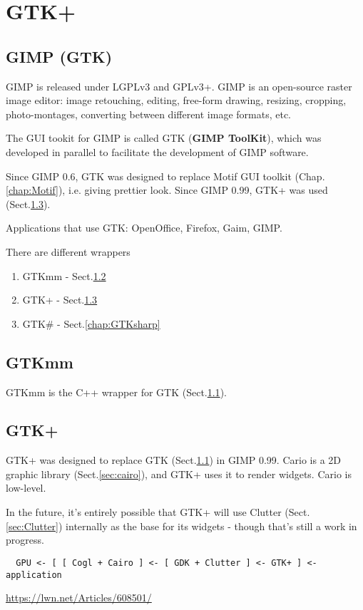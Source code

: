 \chapter{GTK+}
\label{chap:GTK+}

\section{GIMP (GTK)}
\label{sec:GTK}

GIMP is released under LGPLv3 and GPLv3+. GIMP is an open-source raster image
editor: image retouching, editing, free-form drawing, resizing, cropping,
photo-montages, converting between different image formats, etc.

The GUI tookit for GIMP is called GTK ({\bf GIMP ToolKit}), which was developed
in parallel to facilitate the development of GIMP software.

Since GIMP 0.6, GTK was designed to replace Motif GUI toolkit
(Chap.\ref{chap:Motif}), i.e. giving prettier look. Since GIMP 0.99, GTK+ was
used (Sect.\ref{sec:GTK+}).

Applications that use GTK: OpenOffice, Firefox, Gaim, GIMP.

There are different wrappers
\begin{enumerate}
  \item GTKmm - Sect.\ref{sec:GTKmm}
  \item GTK+ - Sect.\ref{sec:GTK+}
  \item GTK\# - Sect.\ref{chap:GTKsharp}
\end{enumerate}

\section{GTKmm}
\label{sec:GTKmm}

GTKmm is the C++ wrapper for GTK (Sect.\ref{sec:GTK}).

\section{GTK+}
\label{sec:GTK+}

GTK+ was designed to replace GTK (Sect.\ref{sec:GTK}) in GIMP 0.99.
Cario is a 2D graphic library (Sect.\ref{sec:cairo}), and GTK+ uses it to render
widgets. Cario is low-level.

In the future, it's entirely possible that GTK+ will use Clutter
(Sect.\ref{sec:Clutter}) internally as the base for its widgets - though that's
still a work in progress.
\begin{verbatim}
  GPU <- [ [ Cogl + Cairo ] <- [ GDK + Clutter ] <- GTK+ ] <- application
\end{verbatim}
\url{https://lwn.net/Articles/608501/}

